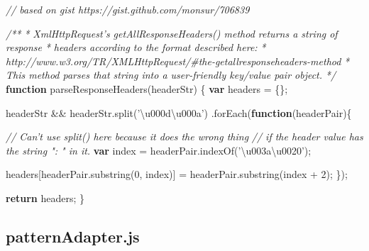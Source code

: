 \documentclass[12pt, ]{article}
\newenvironment{Shaded}{}{}
\newcommand{\KeywordTok}[1]{\textcolor[rgb]{0.00,0.44,0.13}{\textbf{{#1}}}}
\newcommand{\DecValTok}[1]{\textcolor[rgb]{0.25,0.63,0.44}{{#1}}}
\newcommand{\StringTok}[1]{\textcolor[rgb]{0.25,0.44,0.63}{{#1}}}
\newcommand{\CommentTok}[1]{\textcolor[rgb]{0.38,0.63,0.69}{\textit{{#1}}}}
\newcommand{\OtherTok}[1]{\textcolor[rgb]{0.00,0.44,0.13}{{#1}}}
\newcommand{\FunctionTok}[1]{\textcolor[rgb]{0.02,0.16,0.49}{{#1}}}
\newcommand{\NormalTok}[1]{{#1}}
\begin{document}
\label{src_parseResponseHeaders.browser}

\begin{Shaded}
\begin{Highlighting}[]
\CommentTok{// based on gist https://gist.github.com/monsur/706839}

\CommentTok{/**}
\CommentTok{ * XmlHttpRequest's getAllResponseHeaders() method returns a string of response}
\CommentTok{ * headers according to the format described here:}
\CommentTok{ * http://www.w3.org/TR/XMLHttpRequest/#the-getallresponseheaders-method}
\CommentTok{ * This method parses that string into a user-friendly key/value pair object.}
\CommentTok{ */}
\KeywordTok{function} \FunctionTok{parseResponseHeaders}\NormalTok{(headerStr) \{}
   \KeywordTok{var} \NormalTok{headers = \{\};}
   
   \NormalTok{headerStr && }\OtherTok{headerStr}\NormalTok{.}\FunctionTok{split}\NormalTok{(}\StringTok{'\textbackslash{}u000d\textbackslash{}u000a'}\NormalTok{)}
      \NormalTok{.}\FunctionTok{forEach}\NormalTok{(}\KeywordTok{function}\NormalTok{(headerPair)\{}
   
         \CommentTok{// Can't use split() here because it does the wrong thing}
         \CommentTok{// if the header value has the string ": " in it.}
         \KeywordTok{var} \NormalTok{index = }\OtherTok{headerPair}\NormalTok{.}\FunctionTok{indexOf}\NormalTok{(}\StringTok{'\textbackslash{}u003a\textbackslash{}u0020'}\NormalTok{);}
         
         \NormalTok{headers[}\OtherTok{headerPair}\NormalTok{.}\FunctionTok{substring}\NormalTok{(}\DecValTok{0}\NormalTok{, index)] }
                     \NormalTok{= }\OtherTok{headerPair}\NormalTok{.}\FunctionTok{substring}\NormalTok{(index + }\DecValTok{2}\NormalTok{);}
      \NormalTok{\});}
   
   \KeywordTok{return} \NormalTok{headers;}
\NormalTok{\}}
\end{Highlighting}
\end{Shaded}

\pagebreak

\subsection{patternAdapter.js}\label{headerux5fpatternAdapter}

\label{src_patternAdapter}
\end{document}
